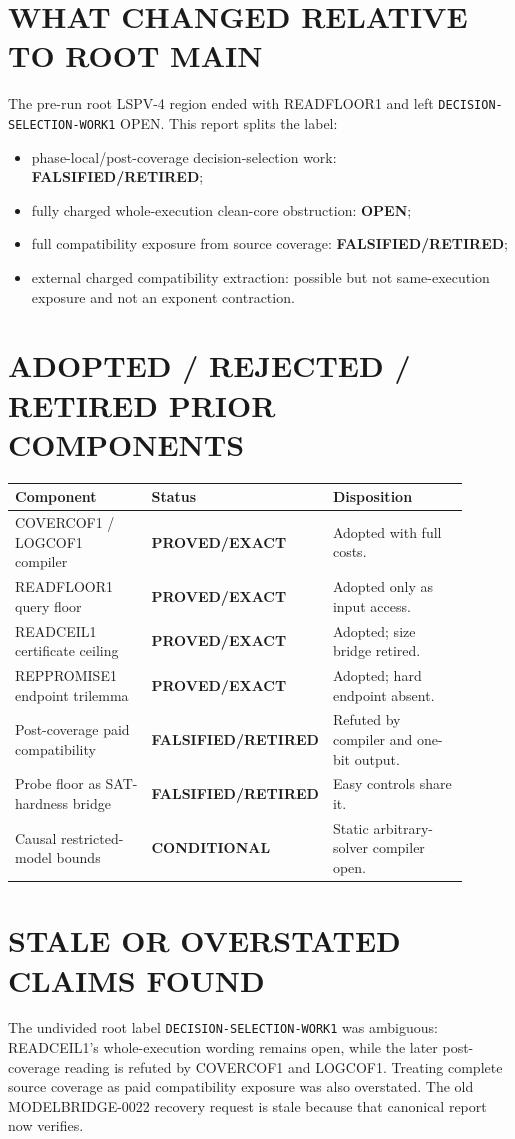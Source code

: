 \documentclass[11pt]{article}
\newcommand{\PROVED}{\textbf{PROVED/EXACT}}
\newcommand{\COND}{\textbf{CONDITIONAL}}
\newcommand{\OPEN}{\textbf{OPEN}}
\newcommand{\RET}{\textbf{FALSIFIED/RETIRED}}
\begin{document}
\section*{WHAT CHANGED RELATIVE TO ROOT MAIN}
The pre-run root LSPV-4 region ended with READFLOOR1 and left
\texttt{DECISION-SELECTION-WORK1} OPEN. This report splits the label:
\begin{itemize}
\item phase-local/post-coverage decision-selection work: \RET;
\item fully charged whole-execution clean-core obstruction: \OPEN;
\item full compatibility exposure from source coverage: \RET;
\item external charged compatibility extraction: possible but not
same-execution exposure and not an exponent contraction.
\end{itemize}

\section*{ADOPTED / REJECTED / RETIRED PRIOR COMPONENTS}
\begin{longtable}{p{0.34\linewidth}p{0.18\linewidth}p{0.38\linewidth}}
\toprule Component & Status & Disposition\\ \midrule
COVERCOF1 / LOGCOF1 compiler & \PROVED & Adopted with full costs.\\
READFLOOR1 query floor & \PROVED & Adopted only as input access.\\
READCEIL1 certificate ceiling & \PROVED & Adopted; size bridge retired.\\
REPPROMISE1 endpoint trilemma & \PROVED & Adopted; hard endpoint absent.\\
Post-coverage paid compatibility & \RET & Refuted by compiler and one-bit output.\\
Probe floor as SAT-hardness bridge & \RET & Easy controls share it.\\
Causal restricted-model bounds & \COND & Static arbitrary-solver compiler open.\\
\bottomrule
\end{longtable}

\section*{STALE OR OVERSTATED CLAIMS FOUND}
The undivided root label \texttt{DECISION-SELECTION-WORK1} was ambiguous:
READCEIL1's whole-execution wording remains open, while the later
post-coverage reading is refuted by COVERCOF1 and LOGCOF1. Treating complete
source coverage as paid compatibility exposure was also overstated. The old
MODELBRIDGE-0022 recovery request is stale because that canonical report now
verifies.
\end{document}
